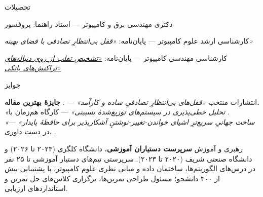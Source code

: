 \documentclass[11pt]{article}
\begin{document}
\begin{faSection}{تحصیلات}

دکتری مهندسی برق و کامپیوتر --- استاد راهنما: پروفسور 

\vspace{0.4em}
کارشناسی ارشد علوم کامپیوتر --- پایان‌نامه: \textit{«قفل بی‌انتظارِ تصادفی با فضای بهینه»}

\vspace{0.4em}
کارشناسی مهندسی کامپیوتر --- پایان‌نامه: \href{https://github.com/kahbodaeini/Fraud-Detection}{\textit{«تشخیص تقلب از روی دنباله‌های تراکنش‌های بانکی»}}

\end{faSection}

\begin{faSection}{جوایز}
\end{faSection}

\begin{faSection}{انتشارات منتخب}
\textit{«قفل‌های بی‌انتظارِ تصادفیِ ساده و کارآمد»} --- . \textbf{جایزۀ بهترین مقاله.}\\
\textit{«تحلیل خطی‌پذیری در سیستم‌های توزیع‌شدۀ نسبیتی»} --- کارگاه  هم‌زمان با .\\
\textit{«ساخت جهانیِ سریع‌ترِ اشیای خواندن-تغییر-نوشتنِ آشکارپذیر برای حافظۀ پایدار»} --- در دست داوری، .
\end{faSection}

\begin{faSection}{رهبری و آموزش}
\textbf{سرپرست دستیاران آموزشی}، دانشگاه کلگری (۲۰۲۳ تا ۲۰۲۶) و دانشگاه صنعتی شریف (۲۰۲۰ تا ۲۰۲۳). سرپرستی تیم‌های دستیار آموزشی تا ۲۵ نفر در درس‌های الگوریتم‌ها، ساختمان داده و مبانی نظری علوم کامپیوتر، با پشتیبانی بیش از ۴۰۰ دانشجو؛ مسئول طراحی تمرین‌ها، برگزاری کلاس‌های حل تمرین و استانداردهای ارزیابی.
\end{faSection}
\end{document}
